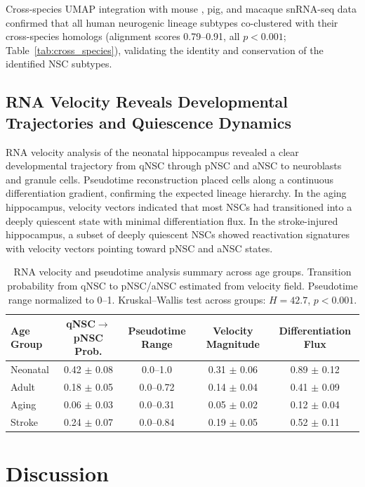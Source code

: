 \documentclass[11pt]{article}
\begin{document}
Cross-species UMAP integration with mouse \citep{hochgerner2018conserved}, pig, and macaque \citep{franjic2022transcriptomic} snRNA-seq data confirmed that all human neurogenic lineage subtypes co-clustered with their cross-species homologs (alignment scores 0.79--0.91, all $p < 0.001$; Table~\ref{tab:cross_species}), validating the identity and conservation of the identified NSC subtypes.

\subsection{RNA Velocity Reveals Developmental Trajectories and Quiescence Dynamics}

RNA velocity analysis of the neonatal hippocampus revealed a clear developmental trajectory from qNSC through pNSC and aNSC to neuroblasts and granule cells. Pseudotime reconstruction placed cells along a continuous differentiation gradient, confirming the expected lineage hierarchy. In the aging hippocampus, velocity vectors indicated that most NSCs had transitioned into a deeply quiescent state with minimal differentiation flux. In the stroke-injured hippocampus, a subset of deeply quiescent NSCs showed reactivation signatures with velocity vectors pointing toward pNSC and aNSC states.

\begin{table}[H]
\centering
\caption{RNA velocity and pseudotime analysis summary across age groups. Transition probability from qNSC to pNSC/aNSC estimated from velocity field. Pseudotime range normalized to 0--1. Kruskal--Wallis test across groups: $H = 42.7$, $p < 0.001$.}
\label{tab:velocity}
\begin{tabular}{lcccc}
\toprule
Age Group & qNSC$\to$pNSC Prob. & Pseudotime Range & Velocity Magnitude & Differentiation Flux \\
\midrule
Neonatal & 0.42 $\pm$ 0.08 & 0.0--1.0 & 0.31 $\pm$ 0.06 & 0.89 $\pm$ 0.12 \\
Adult & 0.18 $\pm$ 0.05 & 0.0--0.72 & 0.14 $\pm$ 0.04 & 0.41 $\pm$ 0.09 \\
Aging & 0.06 $\pm$ 0.03 & 0.0--0.31 & 0.05 $\pm$ 0.02 & 0.12 $\pm$ 0.04 \\
Stroke & 0.24 $\pm$ 0.07 & 0.0--0.84 & 0.19 $\pm$ 0.05 & 0.52 $\pm$ 0.11 \\
\bottomrule
\end{tabular}
\end{table}

\section{Discussion}
\end{document}
